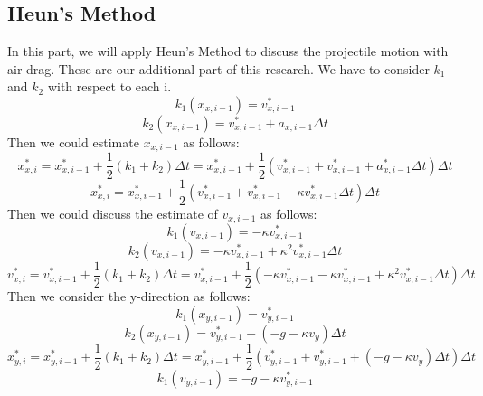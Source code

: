 \documentclass[12pt]{report}
\begin{document}
\subsection{Heun's Method}
In this part, we will apply Heun's Method to discuss the projectile motion with air drag. These are our additional part of this research. We have to consider $k_1$ and $k_2$ with respect to each i. 
\begin{equation}
    k_{1}(x_{x,i-1})=v_{x,i-1}^*
\end{equation}
\begin{equation}
    k_{2}(x_{x,i-1})=v_{x,i-1}^* + a_{x,i-1}\Delta t
\end{equation}
Then we could estimate $x_{x,i-1}$ as follows:
\begin{equation}
    x_{x,i}^*=x_{x,i-1}^*+\frac{1}{2}(k_{1}+k_{2})\Delta t=x_{x,i-1}^*+\frac{1}{2}(v_{x,i-1}^*+v_{x,i-1}^* + a_{x,i-1}^*\Delta t)\Delta t
\end{equation}
\begin{equation}
   x_{x,i}^* =x_{x,i-1}^*+\frac{1}{2}(v_{x,i-1}^*+v_{x,i-1}^*-\kappa v_{x,i-1}^*\Delta t)\Delta t
\end{equation}
Then we could discuss the estimate of $v_{x,i-1}$ as follows:
\begin{equation}
    k_{1}(v_{x,i-1})=-\kappa v_{x,i-1}^*
\end{equation}
\begin{equation}
    k_{2}(v_{x,i-1})=-\kappa v_{x,i-1}^* + \kappa^2 v_{x,i-1}^*\Delta t
\end{equation}
\begin{equation}
    v_{x,i}^*=v_{x,i-1}^*+\frac{1}{2}(k_{1}+k_{2})\Delta t
   =v_{x,i-1}^*+\frac{1}{2}(-\kappa v_{x,i-1}^*-\kappa v_{x,i-1}^* + \kappa^2v_{x,i-1}^*\Delta t)\Delta t
\end{equation}
Then we consider the y-direction as follows:  
\begin{equation}
    k_{1}(x_{y,i-1})=v_{y,i-1}^*
\end{equation}
\begin{equation}
    k_{2}(x_{y,i-1})=v_{y,i-1}^* +(-g-\kappa v_{y})\Delta t
\end{equation}
\begin{equation}
    x_{y,i}^*=x_{y,i-1}^*+\frac{1}{2}(k_{1}+k_{2})\Delta t
   =x_{y,i-1}^*+\frac{1}{2}(v_{y,i-1}^*+v_{y,i-1}^* +(-g-\kappa v_{y})\Delta t)\Delta t
\end{equation}
\clearpage
\begin{equation}
    k_{1}(v_{y,i-1})=-g-\kappa v_{y,i-1}^*
\end{equation}
\end{document}
